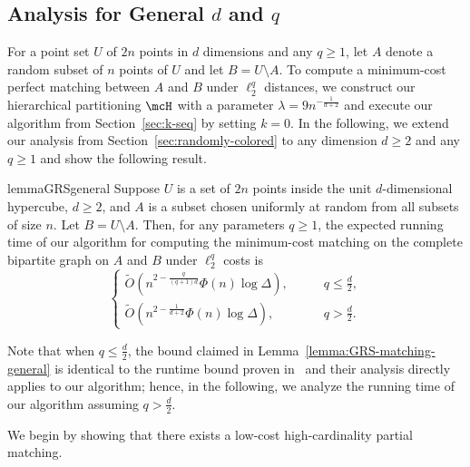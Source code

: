 \subsection{Analysis for General \texorpdfstring{$d$}{} and \texorpdfstring{$q$}{}}\label{sec:appendix-GRS}
For a point set $U$ of $2n$ points in $d$ dimensions and any $q\ge 1$, let $A$ denote a random subset of $n$ points of $U$ and let $B=U\setminus A$. 
To compute a minimum-cost perfect matching between $A$ and $B$ under $\ell_2^q$ distances, we construct our hierarchical partitioning $\mcH$ with a parameter $\lambda=9n^{-\frac{1}{d+2}}$ and execute our algorithm from Section~\ref{sec:k-seq} by setting $k=0$. In the following, we extend our analysis from Section~\ref{sec:randomly-colored} to any dimension $d\ge 2$ and any $q\ge 1$ and show the following result.


\begin{restatable}{lemma}{GRSgeneral}\label{lemma:GRS-matching-general}
    Suppose $U$ is a set of $2n$ points inside the unit $d$-dimensional hypercube, $d\ge 2$, and $A$ is a subset chosen uniformly at random from all subsets of size $n$. Let $B=U\setminus A$. Then, for any parameters $q\ge 1$, the expected running time of our algorithm for computing the minimum-cost matching on the complete bipartite graph on $A$ and $B$ under $\ell_2^q$ costs is
    \begin{equation*}
    \begin{cases}
        \tilde{O}(n^{2-\frac{q}{(q+1)d}}\Phi(n)\log \Delta),\qquad &q\le\frac{d}{2},\\
        \tilde{O}(n^{2-\frac{1}{d+2}}\Phi(n)\log \Delta),\qquad &q>\frac{d}{2}.
    \end{cases}
\end{equation*}
\end{restatable}

%
Note that when $q\le \frac{d}{2}$, the bound claimed in Lemma~\ref{lemma:GRS-matching-general} is identical to the runtime bound proven in~\cite[Theorem B.2]{gattani2023robust} and their analysis directly applies to our algorithm; hence, in the following, we analyze the running time of our algorithm assuming $q>\frac{d}{2}$.

We begin by showing that there exists a low-cost high-cardinality partial matching.

